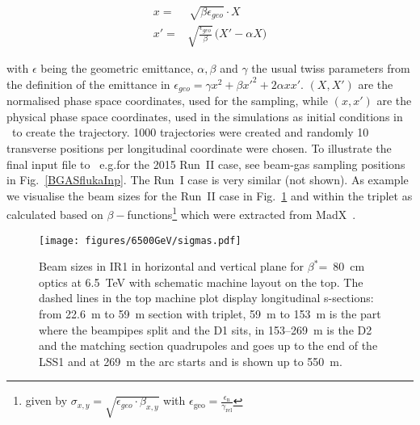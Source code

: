 \begin{equation} \label{eq1}
  \begin{split}
x = & \, \sqrt{\beta \epsilon_{geo}} \cdot X \\
x' = & \sqrt{\frac{\epsilon_{geo}}{\beta}} \, \big( X' - \alpha X \big)
  \end{split}
\end{equation}

with $\epsilon$ being the geometric emittance, $\alpha, \beta$ and $\gamma$ the usual twiss parameters from the definition of the emittance in $\epsilon_{geo} = \gamma x^2 + \beta x'^2 + 2 \alpha x x'$. $(X,X')$ are the normalised phase space coordinates, used for the sampling, while $(x,x')$ are the physical phase space coordinates, used in the simulations as initial conditions in \fluka~to create the trajectory. 1000 trajectories were created and randomly 10 transverse positions per longitudinal coordinate were chosen. To illustrate the final input file to \fluka~e.g.for the 2015 Run~II case, see beam-gas sampling positions in Fig.~\ref{BGASflukaInp}. The Run~I case is very similar (not shown). As example we visualise the beam sizes for the Run~II case in Fig.~\ref{twissfileBS} and within the triplet as calculated based on $\beta-$functions\footnote{given by $\sigma_{x,y} = \sqrt{\epsilon_{geo} \cdot \beta_{x,y}}$ with $\epsilon_{\textrm{geo}} = \frac{ \epsilon_{\textrm{n}}}{\gamma_{\textrm{rel}}}$} which were extracted from MadX~\cite{madx}.


\begin{figure}%
\begin{center}
  \texttt{[image: figures/6500GeV/sigmas.pdf]}
\end{center}
\vspace{-0.6cm}
 \caption{Beam sizes in IR1 in horizontal and vertical plane for $\beta^*$=~80~cm optics at 6.5~TeV with schematic machine layout on the top. The dashed lines in the top machine plot display longitudinal s-sections: from 22.6~m to 59~m section with triplet, 59~m to 153~m is the part where the beampipes split and the D1 sits, in 153--269~m is the D2 and the matching section quadrupoles and goes up to the end of the LSS1 and at 269~m the arc starts and is shown up to 550~m.
  \label{twissfileBS}}
\end{figure}
 

